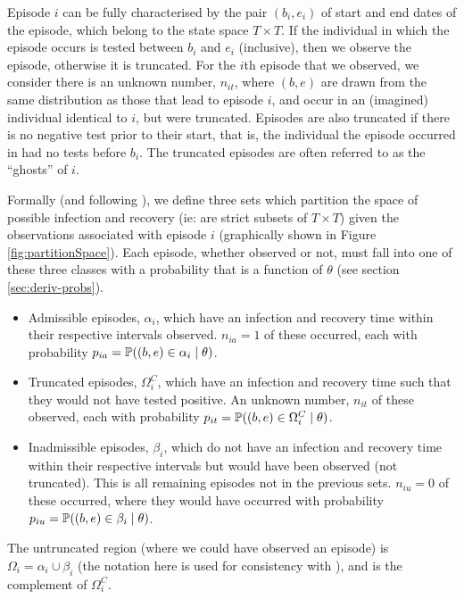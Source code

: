\documentclass[main.tex]{subfiles}
\begin{document}
Episode $i$ can be fully characterised by the pair $(b_i, e_i)$ of
start and end dates of the episode, which belong to the state space
$T \times T$. If the individual in which the episode occurs is tested
between $b_i$ and $e_i$ (inclusive), then we observe the episode,
otherwise it is truncated. For the $i$th episode that we observed, we
consider there is an unknown number, $n_{it}$, where $(b, e)$ are
drawn from the same distribution as those that lead to episode $i$,
and occur in an (imagined) individual identical to $i$, but were
truncated. Episodes are also truncated if there is no negative test
prior to their start, that is, the individual the episode occurred in
had no tests before $b_i$. The truncated episodes are often referred
to as the ``ghosts'' of $i$.

Formally (and following \textcite{heiseyModelling}), we
define three sets which partition the space of possible infection and
recovery (ie: are strict subsets of $T \times T$) given the
observations associated with episode $i$ (graphically shown in Figure
\ref{fig:partitionSpace}). Each episode, whether observed or not, must
fall into one of these three classes with a probability that is a
function of $\theta$ (see section \ref{sec:deriv-probs}).

\begin{itemize}
\item
  Admissible episodes, $\alpha_i$, which have an infection and
  recovery time within their respective intervals observed.
  $n_{ia} =1$ of these occurred, each with probability
  $p_{ia} = \operatorname{\mathbb{P}}((b, e) \in \alpha_i \mid \theta)$.
\item
  Truncated episodes, $\Omega_i^C$, which have an infection and
  recovery time such that they would not have tested positive. An
  unknown number, $n_{it}$ of these observed, each with probability
  $p_{it} = \operatorname{\mathbb{P}}((b, e) \in \Omega^C_i \mid \theta)$.
\item
  Inadmissible episodes, $\beta_i$, which do not have an infection and
  recovery time within their respective intervals but would have been
  observed (not truncated). This is all remaining episodes not in the
  previous sets. $n_{iu} = 0$ of these occurred, where they would have
  occurred with probability
  $p_{iu} = \operatorname{\mathbb{P}}((b, e) \in \beta_i \mid \theta)$.
\end{itemize}

The untruncated region (where we could have observed an episode) is
$\Omega_i = \alpha_i \cup \beta_i$ (the notation here is used for
consistency with \textcite{heiseyModelling}), and is the
complement of $\Omega^C_i$.
\end{document}
